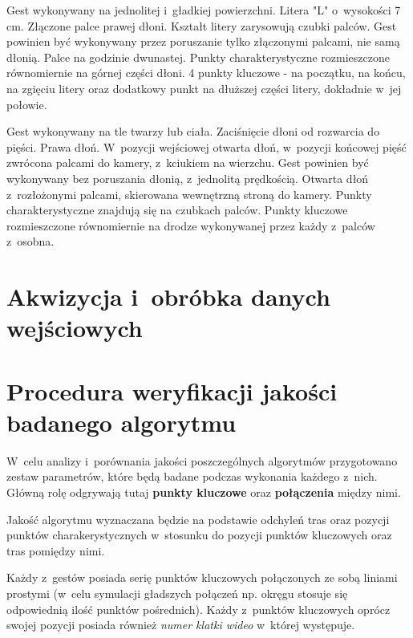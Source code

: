          {Gest wykonywany na jednolitej i~gładkiej powierzchni.}
         {Litera "L" o~wysokości 7 cm.}
         {Złączone palce prawej dłoni.}
         {Kształt litery zarysowują czubki palców.}
         {Gest powinien być wykonywany przez poruszanie tylko złączonymi palcami, nie samą dłonią.}
         {Palce na godzinie dwunastej.}
         {Punkty charakterystyczne rozmieszczone równomiernie na górnej części dłoni.}
         {4 punkty kluczowe - na początku, na końcu, na zgięciu litery oraz dodatkowy punkt na dłuższej części litery, dokładnie w~jej połowie.}

    \newpage
         {Gest wykonywany na tle twarzy lub ciała.}
         {Zaciśnięcie dłoni od rozwarcia do pięści.}
         {Prawa dłoń.}
         {W~pozycji wejściowej otwarta dłoń, w~pozycji końcowej pięść zwrócona palcami do kamery, z~kciukiem na wierzchu.}
         {Gest powinien być wykonywany bez poruszania dłonią, z~jednolitą prędkością.}
         {Otwarta dłoń z~rozłożonymi palcami, skierowana wewnętrzną stroną do kamery.}
         {Punkty charakterystyczne znajdują się na czubkach palców.}
         {Punkty kluczowe rozmieszczone równomiernie na drodze wykonywanej przez każdy z~palców z~osobna.}

  \section{Akwizycja i~obróbka danych wejściowych}\label{Section_Akwizycja}

  \section{Procedura weryfikacji jakości badanego algorytmu}\label{Section_Jakosc}

    W~celu analizy i~porównania jakości poszczególnych algorytmów przygotowano zestaw parametrów, które będą badane podczas wykonania każdego z~nich. Główną rolę odgrywają tutaj \textbf{punkty kluczowe} oraz \textbf{połączenia} między nimi.

    Jakość algorytmu wyznaczana będzie na podstawie odchyleń tras oraz pozycji punktów charakerystycznych w~stosunku do pozycji punktów kluczowych oraz tras pomiędzy nimi.

    Każdy z~gestów posiada serię punktów kluczowych połączonych ze sobą liniami prostymi (w~celu symulacji gładszych połączeń np. okręgu stosuje się odpowiednią ilość punktów pośrednich). Każdy z~punktów kluczowych oprócz swojej pozycji posiada również \textit{numer klatki wideo} w~której występuje.

